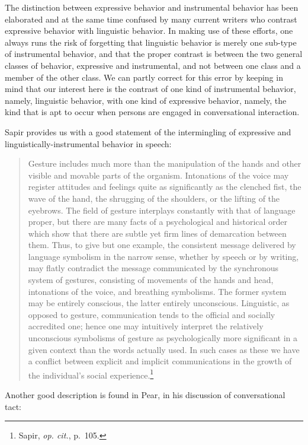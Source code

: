 \documentclass[twoside,symmetric,nobib,justified]{tufte-book}
\begin{document}
\noindent The distinction between expressive behavior and instrumental behavior
has been elaborated and at the same time confused by many current
writers who contrast expressive behavior with linguistic behavior. In
making use of these efforts, one always runs the risk of forgetting that
linguistic behavior is merely one sub-type of instrumental behavior, and
that the proper contrast is between the two general classes of behavior,
expressive and instrumental, and not between one class and a member of
the other class. We can partly correct for this error by keeping in mind
that our interest here is the contrast of one kind of instrumental
behavior, namely, linguistic behavior, with one kind of expressive
behavior, namely, the kind that is apt to occur when persons are engaged
in conversational interaction.

Sapir provides us with a good statement of the intermingling of
expressive and linguistically-instrumental behavior in speech:

\begin{quote}
Gesture includes much more than the manipulation of the hands and other
visible and movable parts of the organism. Intonations of the voice may
register attitudes and feelings quite as significantly as the clenched
fist, the wave of the hand, the shrugging of the shoulders, or the
lifting of the eyebrows. The field of gesture interplays constantly with
that of language proper, but there are many facts of a psychological and
historical order which show that there are subtle yet firm lines of
demarcation between them. Thus, to give but one example, the consistent
message delivered by language symbolism in the narrow sense, whether by
speech or by writing, may flatly contradict the message communicated by
the synchronous system of gestures, consisting of movements of the hands
and head, intonations of the voice, and breathing symbolisms. The former
system may be entirely conscious, the latter entirely unconscious.
Linguistic, as opposed to gesture, communication tends to the official
and socially accredited one; hence one may intuitively interpret the
relatively unconscious symbolisms of gesture as psychologically more
significant in a given context than the words actually used. In such
cases as these we have a conflict between explicit and implicit
communications in the growth of the individual's social
experience.\footnote{Sapir, \emph{op. cit.}, p.~105.}
\end{quote}

\noindent Another good description is found in Pear, in his discussion of
conversational tact:
\end{document}

